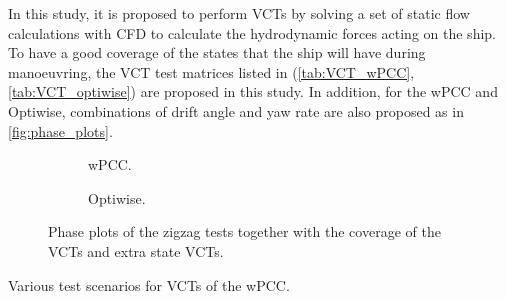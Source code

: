 \noindent In this study, it is proposed to perform VCTs by solving a set of static flow calculations with CFD to calculate the hydrodynamic forces acting on the ship. To have a good coverage of the states that the ship will have during manoeuvring, the VCT test matrices listed in (\autoref{tab:VCT_wPCC}, \autoref{tab:VCT_optiwise}) are proposed in this study. In addition, for the wPCC and Optiwise, combinations of drift angle and yaw rate are also proposed as in \autoref{fig:phase_plots}. 
\begin{figure}[h]
     \centering
     \begin{subfigure}[b]{0.49\textwidth}
         \centering
         
        \caption{wPCC.}
        \label{fig:VCT_phase_plot_wPCC}
     \end{subfigure}
     \hfill
     \begin{subfigure}[b]{0.49\textwidth}
        \centering
        
        \caption{Optiwise.}
        \label{fig:VCT_phase_plot_optiwise}
     \end{subfigure}
        \caption{Phase plots of the zigzag tests together with the coverage of the VCTs and extra state VCTs.}
        \label{fig:phase_plots}
\end{figure}
\begin{table}[h]
    \centering
    \scriptsize
    \caption{Various test scenarios for VCTs of the wPCC.}
    \label{tab:VCT_wPCC}
\end{table}
